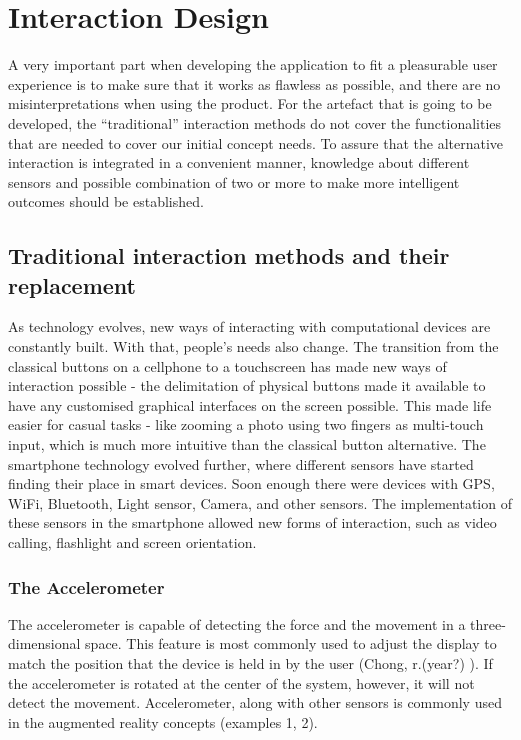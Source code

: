 \section{Interaction Design}
A very important part when developing the application to fit a pleasurable user experience is to make sure that it works as flawless as possible, and there are no misinterpretations when using the product. For the artefact that is going to be developed, the “traditional” interaction methods do not cover the functionalities that are needed to cover our initial concept needs. To assure that the alternative interaction is integrated in a convenient manner, knowledge about different sensors and possible combination of two or more to make more intelligent outcomes should be established.
\subsection{Traditional interaction methods and their replacement}
As technology evolves, new ways of interacting with computational devices are constantly built. With that, people’s needs also change. The transition from the classical buttons on a cellphone to a touchscreen has made new ways of interaction possible - the delimitation of physical buttons made it available to have any customised graphical interfaces on the screen possible. This made life easier for casual tasks - like zooming a photo using two fingers as multi-touch input, which is much more intuitive than the classical button alternative.
The smartphone technology evolved further, where different sensors have started finding their place in smart devices. Soon enough there were devices with GPS, WiFi, Bluetooth, Light sensor, Camera, and other sensors. The implementation of these sensors in the smartphone allowed new forms of interaction, such as video calling, flashlight and screen orientation.
\subsubsection*{The Accelerometer}
The accelerometer is capable of detecting the force and the movement in a three-dimensional space. This feature is most commonly used to adjust the display to match the position that the device is held in by the user (Chong, r.(year?) ). If the accelerometer is rotated at the center of the system, however, it will not detect the movement. Accelerometer, along with other sensors is commonly used in the augmented reality concepts (examples 1, 2).
